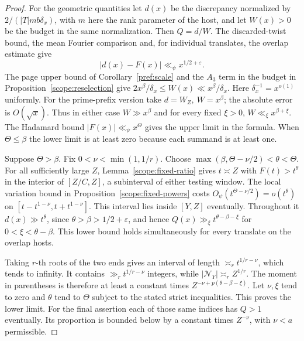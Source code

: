 \begin{proof}
For the geometric quantities let \(d(x)\) be the discrepancy
normalized by \(2/(|T|mb\delta_x)\), with \(m\) here the rank
parameter of the host, and let \(W(x)>0\) be the budget in the
same normalization. Then \(Q=d/W\). The discarded-twist bound,
the mean Fourier comparison and, for individual translates, the
overlap estimate give
\[
   |d(x)-F(x)|\ll_\psi x^{1/2+\varepsilon}.
\]
The page upper bound of Corollary~\ref{pref:scale} and the
\(A_3\) term in the budget in
Proposition~\ref{scope:reselection} give
\(2x^\beta/\delta_x\le W(x)\ll x^\beta/\delta_x\).
Here \(\delta_x^{-1}=x^{o(1)}\) uniformly. For the prime-prefix
version take \(d=W_Z,\ W=x^\beta\); the absolute error is
\(O(\sqrt{x})\). Thus in either case \(W\gg x^\beta\) and for
every fixed \(\xi>0\), \(W\ll_\xi x^{\beta+\xi}\).
The Hadamard bound \(|F(x)|\ll_\psi x^\Theta\) gives the upper
limit in the formula. When \(\Theta\le\beta\) the lower limit is
at least zero because each summand is at least one.

Suppose \(\Theta>\beta\). Fix \(0<\nu<\min(1,1/r)\). Choose
\(\max(\beta,\Theta-\nu/2)<\theta<\Theta\).
For all sufficiently large \(Z\), Lemma~\ref{scope:fixed-ratio}
gives \(t\asymp Z\) with \(F(t)>t^\theta\) in the interior of
\([Z/C,Z]\), a subinterval of either testing window.
The local variation bound in
Proposition~\ref{scope:fixed-powers} costs
\(O_\psi(t^{\Theta-\nu/2})=o(t^\theta)\) on
\([t-t^{1-\nu},t+t^{1-\nu}]\). This interval lies inside \([Y,Z]\)
eventually. Throughout it \(d(x)\gg t^\theta\), since
\(\theta>\beta>1/2+\varepsilon\), and hence
\(Q(x)\gg_\xi t^{\theta-\beta-\xi}\) for \(0<\xi<\theta-\beta\).
This lower bound holds simultaneously for every translate on the
overlap hosts.

Taking \(r\)-th roots of the two ends gives an interval of length
\(\asymp_r t^{1/r-\nu}\), which tends to infinity. It contains
\(\gg_r t^{1/r-\nu}\) integers, while
\(|\mathcal N_Y|\asymp_r Z^{1/r}\). The moment in parentheses is
therefore at least a constant times
\(Z^{-\nu+p(\theta-\beta-\xi)}\).
Let \(\nu,\xi\) tend to zero and \(\theta\) tend to
\(\Theta\) subject to the stated strict inequalities. This proves
the lower limit. For the final assertion each of those same indices
has \(Q>1\) eventually. Its proportion is bounded below by a
constant times \(Z^{-\nu}\), with \(\nu<a\) permissible.
\end{proof}

